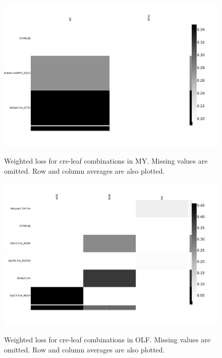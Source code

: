 \begin{figure}[H]
    \centering
    \includegraphics[width = 7in]{figs/lossdetails_354.png} 
    \label{fig:distances}
    \caption{Weighted loss for cre-leaf combinations in MY. Missing values are omitted.   Row and column averages are also plotted.}
\end{figure}

\begin{figure}[H]
    \centering
    \includegraphics[width = 7in]{figs/lossdetails_698.png} 
    \label{fig:distances}
    \caption{Weighted loss for cre-leaf combinations in OLF.  Missing values are omitted.   Row and column averages are also plotted.}
\end{figure}

